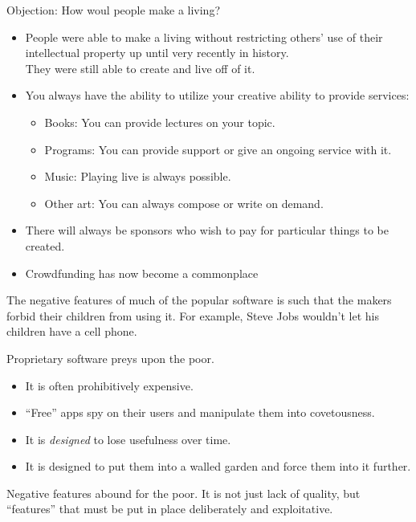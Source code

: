 \documentclass{beamer}
\begin{document}
\begin{frame}
  Objection: How woul people make a living?\pause
  \begin{itemize}
	\item People were able to make a living without restricting others' use of their intellectual property up until very recently in history.\\ \pause
	  They were still able to create and live off of it.\pause
	\item You always have the ability to utilize your creative ability to provide services:\pause
	  \begin{itemize}
		\item Books: You can provide lectures on your topic.\pause
		\item Programs: You can provide support or give an ongoing service with it.\pause
		\item Music: Playing live is always possible.\pause
		\item Other art: You can always compose or write on demand.\pause
	  \end{itemize}
	\item There will always be sponsors who wish to pay for particular things to be created.\pause
	\item Crowdfunding has now become a commonplace
  \end{itemize}
\end{frame}

\begin{frame}
   The negative features of much of the popular software is such that the makers forbid their children from using it.
   For example, Steve Jobs wouldn't let his children have a cell phone.
\end{frame}

\begin{frame}
  Proprietary software preys upon the poor.\pause
  \begin{itemize}
	\item It is often prohibitively expensive.\pause
	\item ``Free'' apps spy on their users and manipulate them into covetousness.\pause
	\item It is \emph{designed} to lose usefulness over time.\pause
	\item It is designed to put them into a walled garden and force them into it further.
  \end{itemize}
\end{frame}

\begin{frame}
  Negative features abound for the poor.
  It is not just lack of quality, but ``features'' that must be put in place deliberately and exploitative.
\end{frame}
\end{document}
